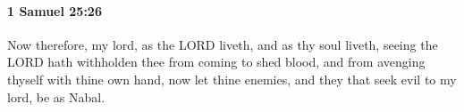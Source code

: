
		\paragraph{1 Samuel 25:26} %
			\label{1SAMUEL-25-26}

			Now therefore, my lord, as the LORD liveth, and as thy soul liveth, seeing the LORD hath withholden thee from coming to shed blood, and from avenging thyself with thine own hand, now let thine enemies, and they that seek evil to my lord, be as Nabal.


